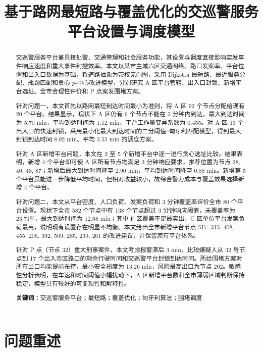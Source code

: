 \documentclass[UTF8,a4paper,12pt]{ctexart}
\title{\heiti 基于路网最短路与覆盖优化的交巡警服务平台设置与调度模型}
\author{}
\date{}
\begin{document}
\maketitle

\begin{abstract}
交巡警服务平台兼具接处警、交通管理和社会服务功能，其设置与调度直接影响突发事件响应速度和重大事件封控效率。本文以某市主城六区交通网络、路口发案率、平台位置和出入口数据为基础，将道路抽象为带权无向图，采用 Dijkstra 最短路、最近服务分配、瓶颈匹配和贪心 $p$-中心改进模型，分别研究 A 区平台管辖、出入口封锁、新增平台选址、全市合理性评价和 P 点案发围堵方案。

针对问题一，本文首先以路网最短到达时间最小为准则，将 A 区 92 个节点分配给现有 20 个平台。结果显示，现状下 A 区仍有 6 个节点不能在 3 分钟内到达，最大到达时间为 5.70 min，平均到达时间为 1.12 min，平台工作量变异系数为 0.455。对 A 区 13 个出入口的快速封锁，采用最小化最大到达时间的二分阈值--匈牙利匹配模型，得到最大封锁到达时间 8.02 min、平均 3.55 min 的调度方案。

针对 A 区新增平台问题，本文在 2 至 5 个新增平台中逐一进行贪心选址比较。结果表明，新增 4 个平台即可使 A 区所有节点均满足 3 分钟响应要求，推荐位置为节点 28, 40, 48, 87；新增后最大到达时间降至 2.90 min，平均到达时间降至 0.88 min。新增第 5 个平台虽能进一步降低平均时间，但相对收益较小，故综合警力成本与覆盖效果选择新增 4 个平台。

针对问题二，本文从平台密度、人口负荷、发案负荷和 3 分钟覆盖率评价全市 80 个平台设置。现状下全市 582 个节点中有 138 个节点超过 3 分钟响应阈值，未覆盖率为 23.71\%，最大到达时间为 12.68 min；其中 F 区覆盖不足最突出，C 区单位平台发案负荷最高，说明现有设置存在明显不均衡。本文给出全市新增平台节点 517, 315, 408, 455, 206, 392, 509, 285, 239, 261 的改进建议，并保留原有平台体系。

针对 P 点（节点 32）重大刑事案件，本文考虑报警滞后 3 min，比较嫌疑人从 32 号节点到 17 个出入市区路口的剩余行驶时间和交巡警平台封锁到达时间。所给围堵方案对所有出口均能提前布控，最小安全裕度为 13.26 min，风险最高出口为节点 202。敏感性分析表明，在车速和时间阈值小幅扰动下，A 区新增平台数和全市薄弱区域判断保持稳定，模型具有较好的可复现性和解释性。

\textbf{关键词：}交巡警服务平台；最短路；覆盖优化；匈牙利算法；围堵调度
\end{abstract}

\newpage
\tableofcontents
\newpage

\section{问题重述}
\end{document}
